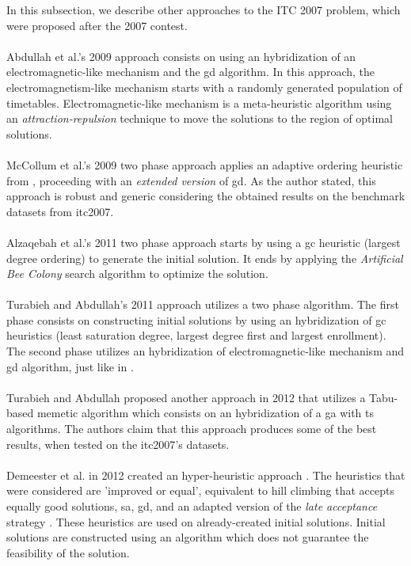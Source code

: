 In this subsection, we describe other approaches to the ITC 2007 problem, which were proposed after the 2007 contest.\\
\\
Abdullah et al.'s 2009 approach \cite{Abdullah2009} consists on using an hybridization of an electromagnetic-like mechanism and the \gls{gd} algorithm. In this approach, the electromagnetism-like mechanism starts with a randomly generated population of timetables. Electromagnetic-like mechanism is a meta-heuristic algorithm using an \textit{attraction-repulsion} technique \cite{Javadian2008} to move the solutions to the region of optimal solutions.\\
\\
McCollum et al.'s 2009 two phase approach \cite{McCollum2009} applies an adaptive ordering heuristic from \cite{Burke2004}, proceeding with an \textit{extended version} of \gls{gd}. As the author stated, this approach is robust and generic considering the obtained results on the benchmark datasets from \gls{itc2007}.\\
\\
Alzaqebah et al.'s 2011 two phase approach \cite{Alzaqebah2011} starts by using a \gls{gc} heuristic (largest degree ordering) to generate the initial solution. It ends by applying the \textit{Artificial Bee Colony} search algorithm to optimize the solution.\\
\\
Turabieh and Abdullah's 2011 approach \cite{Turabieh2011} utilizes a two phase algorithm. The first phase consists on constructing initial solutions by using an hybridization of \gls{gc} heuristics (least saturation degree, largest degree first and largest enrollment). The second phase utilizes an hybridization of electromagnetic-like mechanism and \gls{gd} algorithm, just like in \cite{Abdullah2009}.\\
\\
Turabieh and Abdullah proposed another approach in 2012 \cite{Abdullah2012} that utilizes a Tabu-based memetic algorithm which consists on an hybridization of a \gls{ga} with \gls{ts} algorithms. The authors claim that this approach produces some of the best results, when tested on the \gls{itc2007}'s datasets.\\
\\
Demeester et al. in 2012 created an hyper-heuristic approach \cite{Demeester2012}. The heuristics that were considered are 'improved or equal', equivalent to hill climbing that accepts equally good solutions, \gls{sa}, \gls{gd}, and an adapted version of the \textit{late acceptance} strategy \cite{Burke2008}. These heuristics are used on already-created initial solutions. Initial solutions are constructed using an algorithm which does not guarantee the feasibility of the solution.\\
